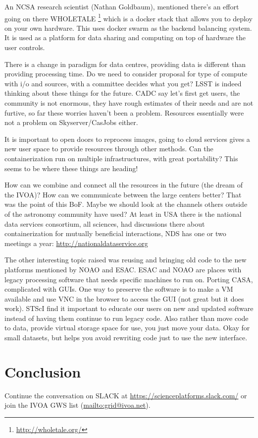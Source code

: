 \documentclass[11pt,twoside]{article}
\begin{document}
An NCSA research scientist (Nathan Goldbaum), mentioned there's an effort going on there WHOLETALE \footnote{\url{http://wholetale.org/}}  which is a docker stack that allows you to deploy on your own hardware. This uses docker swarm as the backend balancing system. It is used as a platform for data sharing and computing on top of hardware the user controls.

There is a change in paradigm for data centres, providing data is different than providing processing time. Do we need to consider proposal for type of compute with i/o and sources, with a committee  decides what you get?
	 LSST is indeed thinking about these things for the future.
	 CADC say let's first get users, the community is not enormous, they have rough estimates of their needs and are not furtive, so far these worries haven't been a problem. Resources essentially were not a problem on Skyserver/CasJobs either.

It is important to open doors to reprocess images, going to cloud services gives a new user space to provide resources through other methods. Can the containerization run on multiple infrastructures, with great portability?
This seems to be where these things are heading!


How can we combine and connect all the resources in the future (the dream of the IVOA)?
How can we communicate between the large centers better?
That was the point of this BoF.
Maybe we should look at the channels others outside of the astronomy community have used?
At least in USA there is the  national data services consortium, all sciences, had discussions there about containerization for mutually beneficial interactions, NDS has one or two meetings a year: \url{http://nationaldataservice.org}


The other interesting topic raised was  reusing and bringing old code to the new platforms mentioned by NOAO and ESAC.
ESAC and NOAO are places with legacy processing software that needs specific machines to run on.
Porting CASA, complicated with GUIs.
One way to preserve the software is to make a VM available and use VNC in the browser to access the GUI (not great but it does work).
STScI find it  important to educate our users on new and updated software instead of having them continue to run legacy code.
Also rather than move code to data, provide virtual storage space for use, you just move your data. Okay for small datasets, but helps you avoid rewriting code just to use the new interface.




\section{Conclusion}
Continue the conversation on SLACK at \url{https://scienceplatforms.slack.com/} or join the IVOA GWS list (\url{mailto:grid@ivoa.net}).

\end{document}
